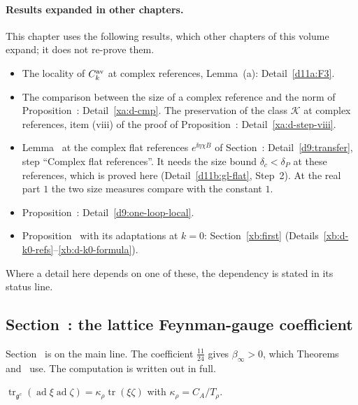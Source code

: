 \paragraph{Results expanded in other chapters.} This chapter uses the following results, which other chapters of this volume expand; it does not re-prove them.
\begin{itemize}
\item The locality of $C^{\rm av}_k$ at complex references, Lemma~(a): Detail~\ref{d11a:F3}.
\item The comparison between the size of a complex reference and the norm of Proposition~: Detail~\ref{xa:d-cmp}. The preservation of the class $\mathcal K$ at complex references, item (viii) of the proof of Proposition~: Detail~\ref{xa:d-step-viii}.
\item Lemma~ at the complex flat references $e^{\ii\eta\chi B}$ of Section~: Detail~\ref{d9:transfer}, step ``Complex flat references''. It needs the size bound $\delta_c<\delta_P$ at these references, which is proved here (Detail~\ref{d11b:gl-flat}, Step~2). At the real part $1$ the two size measures compare with the constant $1$.
\item Proposition~: Detail~\ref{d9:one-loop-local}.
\item Proposition~ with its adaptations at $k=0$: Section~\ref{xb:first} (Details~\ref{xb:d-k0-refs}--\ref{xb:d-k0-formula}).
\end{itemize}
Where a detail here depends on one of these, the dependency is stated in its status line.

\subsection{Section~\texorpdfstring{}{57}: the lattice Feynman-gauge coefficient}\label{d11b:57}

Section~ is on the main line. The coefficient $\frac{11}{24}$ gives $\beta_\infty>0$, which Theorems~ and~ use. The computation is written out in full.

\begin{detail}\label{d11b:kappa}
$\operatorname{tr}_{\mathfrak g^c}(\operatorname{ad}\xi\operatorname{ad}\zeta)=\kappa_\rho\operatorname{tr}(\xi\zeta)$ with $\kappa_\rho=C_A/T_\rho$.
\end{detail}

